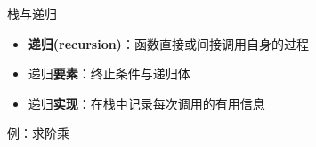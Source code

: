 \begin{fragile}
    \frametitle{\insertsubsectionhead}
    \begin{exampleblock}{栈与递归}
        \begin{itemize}
            \item \textbf{递归(recursion)}：函数直接或间接调用自身的过程
            \item 递归\textbf{要素}：终止条件与递归体
            \item 递归\textbf{实现}：在\alert{栈}中记录每次调用的有用信息
        \end{itemize}
    \end{exampleblock}
    \pause
    \begin{exampleblock}{例：求阶乘}
        \vspace{2ex}
    \end{exampleblock}
\end{fragile}

